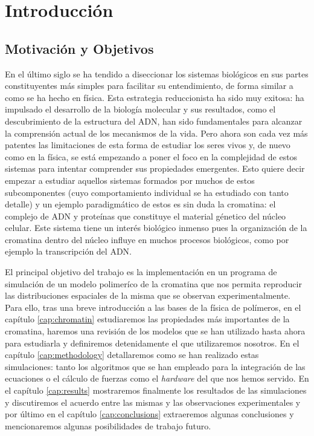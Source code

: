 \chapter{Introducción}
\label{cap:introduction}

\section{Motivación y Objetivos}

En el último siglo se ha tendido a diseccionar los sistemas biológicos en sus partes constituyentes más simples para facilitar su entendimiento, de forma similar a como se ha hecho en física. Esta estrategia reduccionista ha sido muy exitosa: ha impulsado el desarrollo de la biología molecular y sus resultados, como el descubrimiento de la estructura del ADN, han sido fundamentales para alcanzar la comprensión actual de los mecanismos de la vida. Pero ahora son cada vez más patentes las limitaciones de esta forma de estudiar los seres vivos y, de nuevo como en la física, se está empezando a poner el foco en la complejidad de estos sistemas para intentar comprender sus propiedades emergentes. Esto quiere decir empezar a estudiar aquellos sistemas formados por muchos de estos subcomponentes (cuyo comportamiento individual se ha estudiado con tanto detalle) y un ejemplo paradigmático de estos es sin duda la cromatina: el complejo de ADN y proteínas que constituye el material génetico del núcleo celular. Este sistema tiene un interés biológico inmenso pues la organización de la cromatina dentro del núcleo influye en muchos procesos biológicos, como por ejemplo la transcripción del ADN.

El principal objetivo del trabajo es la implementación en un programa de simulación de un modelo polimeríco de la cromatina que nos permita reproducir las distribuciones espaciales de la misma que se observan experimentalmente. Para ello, tras una breve introducción a las bases de la física de polímeros, en el capítulo \ref{cap:chromatin} estudiaremos las propiedades más importantes de la cromatina, haremos una revisión de los modelos que se han utilizado hasta ahora para estudiarla y definiremos detenidamente el que utilizaremos nosotros. En el capítulo \ref{cap:methodology} detallaremos como se han realizado estas simulaciones: tanto los algoritmos que se han empleado para la integración de las ecuaciones o el cálculo de fuerzas como el \textit{hardware} del que nos hemos servido. En el capítulo \ref{cap:results} mostraremos finalmente los resultados de las simulaciones y discutiremos el acuerdo entre las mismas y las observaciones experimentales y por último en el capítulo \ref{cap:conclusions} extraeremos algunas conclusiones y mencionaremos algunas posibilidades de trabajo futuro.


